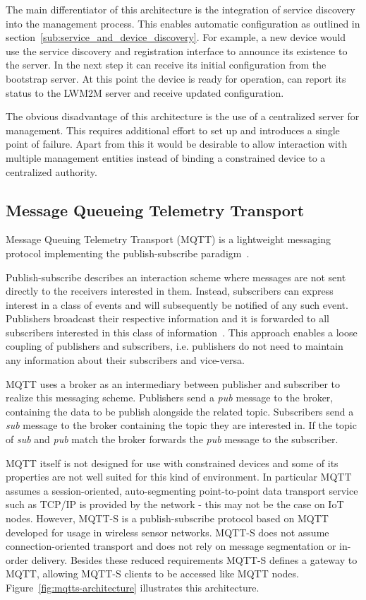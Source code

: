 \documentclass[conference]{IEEEtran}
\begin{document}
The main differentiator of this architecture is the integration of service discovery into the management process. This enables automatic configuration as outlined in section~\ref{sub:service_and_device_discovery}. For example, a new device would use the service discovery and registration interface to announce its existence to the server. In the next step it can receive its initial configuration from the bootstrap server. At this point the device is ready for operation, can report its status to the LWM2M server and receive updated configuration.

The obvious disadvantage of this architecture is the use of a centralized server for management. This requires additional effort to set up and introduces a single point of failure. Apart from this it would be desirable to allow interaction with multiple management entities instead of binding a constrained device to a centralized  authority.



\subsection{Message Queueing Telemetry Transport} %
\label{sub:mqtt}
Message Queuing Telemetry Transport (MQTT) is a lightweight messaging protocol implementing the publish-subscribe paradigm~\cite{mqtt}. 

Publish-subscribe describes an interaction scheme where messages are not sent directly to the receivers interested in them. Instead, subscribers can express interest in a class of events and will subsequently be notified of any such event. Publishers broadcast their respective information and it is forwarded to all subscribers interested in this class of information~\cite{Eugster2003}. This approach enables a loose coupling of publishers and subscribers, i.e. publishers do not need to maintain any information about their subscribers and vice-versa.

MQTT uses a broker as an intermediary between publisher and subscriber to realize this messaging scheme. Publishers send a \textit{pub} message to the broker, containing the data to be publish alongside the related topic. Subscribers send a \textit{sub} message to the broker containing the topic they are interested in. If the topic of \textit{sub} and \textit{pub} match the broker forwards the \textit{pub} message to the subscriber.

MQTT itself is not designed for use with constrained devices and some of its properties are not well suited for this kind of environment. In particular MQTT assumes a session-oriented, auto-segmenting point-to-point data transport service such as TCP/IP is provided by the network - this may not be the case on IoT nodes. However, MQTT-S is a publish-subscribe protocol based on MQTT developed for usage in wireless sensor networks. MQTT-S does not assume connection-oriented transport and does not rely on message segmentation or in-order delivery. Besides these reduced requirements MQTT-S defines a gateway to MQTT, allowing MQTT-S clients to be accessed like MQTT nodes. Figure~\ref{fig:mqtts-architecture} illustrates this architecture.
\end{document}
